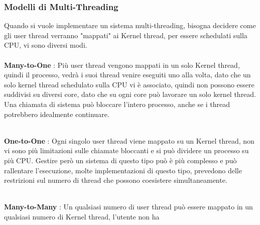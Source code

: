 \documentclass[12pt, letterpaper]{article}
\newcommand{\acc}{\\\hphantom{}\\}
\begin{document}
\subsubsection{Modelli di Multi-Threading}
Quando si vuole implementare un sistema multi-threading, bisogna decidere come gli user thread verranno 
"mappati" ai Kernel thread, per essere schedulati sulla CPU, vi sono diversi modi.\acc
\textbf{Many-to-One} : Più user thread vengono mappati in un solo Kernel thread, quindi il processo, vedrà i suoi 
thread venire eseguiti uno alla volta, dato che un solo kernel thread schedulato sulla CPU vi è associato, quindi non 
possono essere suddivisi su diversi core, dato che su ogni core può lavorare un solo kernel thread. Una chiamata di sistema 
può bloccare l'intero processo, anche se i thread potrebbero idealmente continuare.
\begin{figure}[h]
\end{figure}
\\\textbf{One-to-One} : 
Ogni singolo user thread viene mappato su un Kernel thread, non vi sono più limitazioni sulle 
chiamate bloccanti e si può dividere un processo su più CPU. Gestire però un sistema di questo tipo può 
è più complesso e può rallentare l'esecuzione, molte implementazioni di questo tipo, prevedono delle 
restrizioni sul numero di thread che possono coesistere simultaneamente.
\begin{figure}[h]
\end{figure}
\\\textbf{Many-to-Many} : 
Un qualsiasi numero di user thread può essere mappato in un qualsiasi numero di Kernel thread, l'utente non ha 
\end{document}
